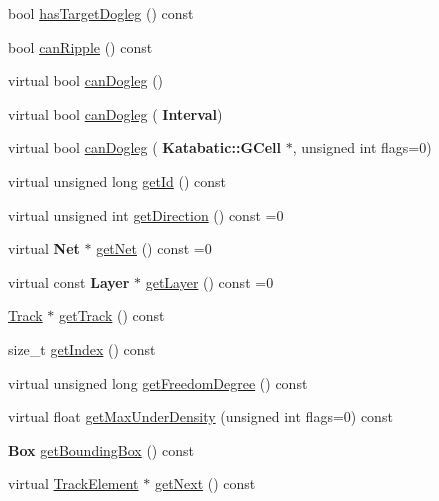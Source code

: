 \begin{DoxyCompactItemize}
\item 
bool \hyperlink{classKite_1_1TrackElement_a2f1f15d433698222015fdda8e7fb599c}{has\+Target\+Dogleg} () const
\item 
bool \hyperlink{classKite_1_1TrackElement_a9b37c425c3152c576444ac0253b04f9f}{can\+Ripple} () const
\item 
virtual bool \hyperlink{classKite_1_1TrackElement_aa0bb6f1592688e942ff67e0ac318a4fd}{can\+Dogleg} ()
\item 
virtual bool \hyperlink{classKite_1_1TrackElement_accb4c6a7ee2678a0cff4dbc4a7860fe1}{can\+Dogleg} (\textbf{ Interval})
\item 
virtual bool \hyperlink{classKite_1_1TrackElement_a4f040cf33009e4886d401115c3bea838}{can\+Dogleg} (\textbf{ Katabatic\+::\+G\+Cell} $\ast$, unsigned int flags=0)
\item 
virtual unsigned long \hyperlink{classKite_1_1TrackElement_afdedcef127ad2a3677a5b48d7d3453f3}{get\+Id} () const
\item 
virtual unsigned int \hyperlink{classKite_1_1TrackElement_ae35b78590ed6aa546b626ef95f28c533}{get\+Direction} () const =0
\item 
virtual \textbf{ Net} $\ast$ \hyperlink{classKite_1_1TrackElement_a2b383a5b6f5028911a35e446a682dabd}{get\+Net} () const =0
\item 
virtual const \textbf{ Layer} $\ast$ \hyperlink{classKite_1_1TrackElement_ad96c66549598873bf68c2e18ec7164c1}{get\+Layer} () const =0
\item 
\hyperlink{classKite_1_1Track}{Track} $\ast$ \hyperlink{classKite_1_1TrackElement_a3f34f9139b8491a0adb531ac3a904171}{get\+Track} () const
\item 
size\+\_\+t \hyperlink{classKite_1_1TrackElement_ad65a47a8b8a83be5d0b456b1074d1220}{get\+Index} () const
\item 
virtual unsigned long \hyperlink{classKite_1_1TrackElement_aa7552c20cc46abcac558627b2ca341f8}{get\+Freedom\+Degree} () const
\item 
virtual float \hyperlink{classKite_1_1TrackElement_aa34ceb4288e76357b65725ca00e56df8}{get\+Max\+Under\+Density} (unsigned int flags=0) const
\item 
\textbf{ Box} \hyperlink{classKite_1_1TrackElement_ab5d8bf98ab5af6fcfebea1b9f446d5d7}{get\+Bounding\+Box} () const
\item 
virtual \hyperlink{classKite_1_1TrackElement}{Track\+Element} $\ast$ \hyperlink{classKite_1_1TrackElement_a010b7fc8801c5b88aefa4137cf85186d}{get\+Next} () const
\item 

\end{DoxyCompactItemize}

